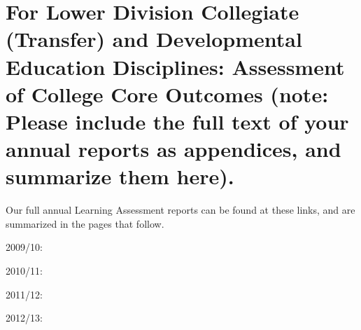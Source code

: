 \section[Assessment of College Core Outcomes]{For Lower Division Collegiate
  (Transfer) and Developmental Education Disciplines:  Assessment of College Core
  Outcomes    (note:  Please include the full text of your annual reports as
  appendices, and summarize them here).}\label{ass:sec:coreoutcomes}

Our full annual Learning Assessment reports can be found at these links, and are summarized in the pages that follow.
\begin{description}
	\item[2009/10:] \cite{annualLASreport2009}
	\item[2010/11:] \cite{annualLASreport2010}
	\item[2011/12:] \cite{annualLASreport2011}
	\item[2012/13:] \cite{annualLASreport2012}
\end{description}

